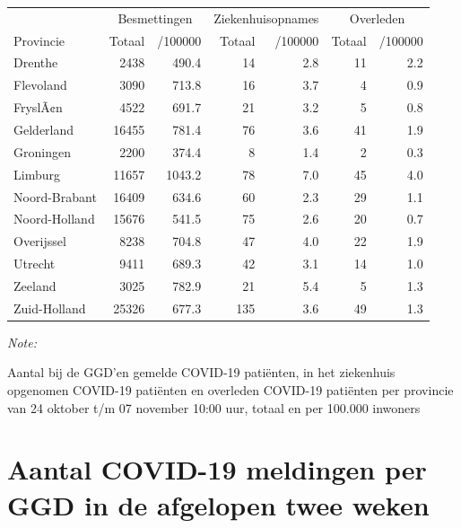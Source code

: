 \documentclass[
  english,
  man,floatsintext]{apa6}
\begin{document}
\begin{table}
\centering
\begin{threeparttable}
\begin{tabular}{lrrrrrr}
\toprule
\multicolumn{1}{c}{ } & \multicolumn{2}{c}{Besmettingen} & \multicolumn{2}{c}{Ziekenhuisopnames} & \multicolumn{2}{c}{Overleden} \\
\cmidrule(l{3pt}r{3pt}){2-3} \cmidrule(l{3pt}r{3pt}){4-5} \cmidrule(l{3pt}r{3pt}){6-7}
Provincie & Totaal & /100000 & Totaal & /100000 & Totaal & /100000\\
\midrule
Drenthe & 2438 & 490.4 & 14 & 2.8 & 11 & 2.2\\
Flevoland & 3090 & 713.8 & 16 & 3.7 & 4 & 0.9\\
FryslÃ¢n & 4522 & 691.7 & 21 & 3.2 & 5 & 0.8\\
Gelderland & 16455 & 781.4 & 76 & 3.6 & 41 & 1.9\\
Groningen & 2200 & 374.4 & 8 & 1.4 & 2 & 0.3\\
Limburg & 11657 & 1043.2 & 78 & 7.0 & 45 & 4.0\\
Noord-Brabant & 16409 & 634.6 & 60 & 2.3 & 29 & 1.1\\
Noord-Holland & 15676 & 541.5 & 75 & 2.6 & 20 & 0.7\\
Overijssel & 8238 & 704.8 & 47 & 4.0 & 22 & 1.9\\
Utrecht & 9411 & 689.3 & 42 & 3.1 & 14 & 1.0\\
Zeeland & 3025 & 782.9 & 21 & 5.4 & 5 & 1.3\\
Zuid-Holland & 25326 & 677.3 & 135 & 3.6 & 49 & 1.3\\
\bottomrule
\end{tabular}
\begin{tablenotes}
\item \textit{Note: } 
\item Aantal bij de GGD’en gemelde COVID-19 patiënten, in het ziekenhuis opgenomen COVID-19 patiënten en overleden COVID-19 patiënten per provincie van 24 oktober t/m 07 november 10:00 uur, totaal en per 100.000 inwoners
\end{tablenotes}
\end{threeparttable}
\end{table}

\newpage

\hypertarget{aantal-covid-19-meldingen-per-ggd-in-de-afgelopen-twee-weken}{%
\section{Aantal COVID-19 meldingen per GGD in de afgelopen twee weken}\label{aantal-covid-19-meldingen-per-ggd-in-de-afgelopen-twee-weken}}
\end{document}

